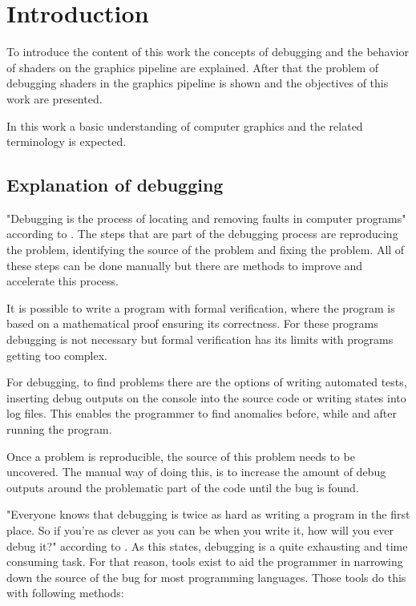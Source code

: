 
\chapter{Introduction}\label{cha:Introduction}

To introduce the content of this work the concepts of debugging and the behavior of shaders on the graphics pipeline are explained. After that the problem of debugging shaders in the graphics pipeline is shown and the objectives of this work are presented.

In this work a basic understanding of computer graphics and the related terminology is expected.

\section{Explanation of debugging}
\label{paragraph:debuging}

"Debugging is the process of locating and removing faults in computer programs" according to . The steps that are part of the debugging process are reproducing the problem, identifying the source of the problem and fixing the problem. All of these steps can be done manually but there are methods to improve and accelerate this process.

It is possible to write a program with formal verification, where the program is based on a mathematical proof ensuring its correctness. For these programs debugging is not necessary but formal verification has its limits with programs getting too complex. 

For debugging, to find problems there are the options of writing automated tests, inserting debug outputs on the console into the source code or writing states into log files. This enables the programmer to find anomalies before, while and after running the program.

Once a problem is reproducible, the source of this problem needs to be uncovered. The manual way of doing this, is to increase the amount of debug outputs around the problematic part of the code until the bug is found.

"Everyone knows that debugging is twice as hard as writing a program in the first place. So if you're as clever as you can be when you write it, how will you ever debug it?" according to . As this states, debugging is a quite exhausting and time consuming task. For that reason, tools exist to aid the programmer in narrowing down the source of the bug for most programming languages. Those tools do this with following methods:

